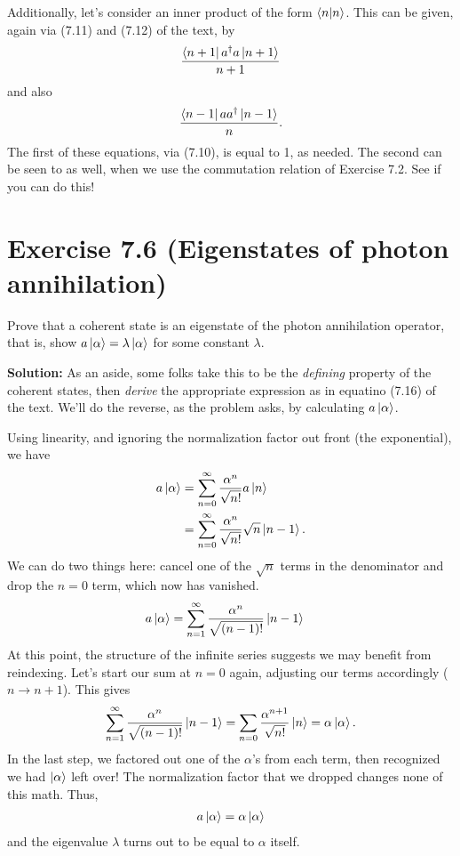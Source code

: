 \documentclass{book}
\begin{document}
    Additionally, let's consider an inner product of the form $\bra{n}\ket{n}$. This can be given, again via (7.11) and (7.12) of the text, by
    \begin{align}
        \frac{\bra{n+1}a^\dagger a \ket{n+1}}{n+1}
    \end{align}
    and also 
    \begin{align}
        \frac{\bra{n-1}a a^\dagger \ket{n-1}}{n}.
    \end{align}
    The first of these equations, via (7.10), is equal to 1, as needed. The second can be seen to as well, when we use the commutation relation of Exercise 7.2. See if you can do this!

\section*{Exercise 7.6 (Eigenstates of photon annihilation)}
    Prove that a coherent state is an eigenstate of the photon annihilation operator, that is, show $a\ket{\alpha} = \lambda \ket{\alpha}$ for some constant $\lambda$.

    \textbf{Solution:} As an aside, some folks take this to be the \emph{defining} property of the coherent states, then \emph{derive} the appropriate expression as in equatino (7.16) of the text. We'll do the reverse, as the problem asks, by calculating $a\ket{\alpha}$.

    Using linearity, and ignoring the normalization factor out front (the exponential), we have
    \begin{align}
    \begin{aligned}
        a\ket{\alpha} &= \sum_{n=0}^\infty \frac{\alpha^n}{\sqrt{n!}} a \ket{n} \\
        &= \sum_{n=0}^\infty \frac{\alpha^n}{\sqrt{n!}} \sqrt{n} \ket{n-1}.
    \end{aligned}
    \end{align}
    We can do two things here: cancel one of the $\sqrt{n}$ terms in the denominator and drop the $n = 0$ term, which now has vanished.
    \begin{align}
        a\ket{\alpha} &= \sum_{n=1}^\infty \frac{\alpha^n}{\sqrt{(n-1)!}}  \ket{n-1}
    \end{align}
    At this point, the structure of the infinite series suggests we may benefit from reindexing. Let's start our sum at $n = 0$ again, adjusting our terms accordingly ($n \to n + 1$). This gives
    \begin{align}
        \sum_{n=1}^\infty \frac{\alpha^n}{\sqrt{(n-1)!}}  \ket{n-1} = \sum_{n=0}\frac{\alpha^{n+1}}{\sqrt{n!}}  \ket{n} = \alpha \ket{\alpha}.
    \end{align}
    In the last step, we factored out one of the $\alpha$'s from each term, then recognized we had $\ket{\alpha}$ left over! The normalization factor that we dropped changes none of this math. Thus,
    \begin{align}
        a \ket{\alpha} = \alpha \ket{\alpha}
    \end{align}
    and the eigenvalue $\lambda$ turns out to be equal to $\alpha$ itself. 
    
\end{document}
